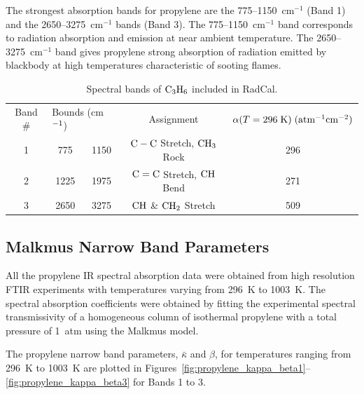 The strongest absorption bands for propylene are the 775--1150~cm$^{-1}$ (Band 1) and the 2650--3275~cm$^{-1}$ bands (Band 3). The 775--1150~cm$^{-1}$ band corresponds to radiation absorption and emission at near ambient temperature. The 2650--3275~cm$^{-1}$ band gives propylene strong absorption of radiation emitted by blackbody at high temperatures characteristic of sooting flames.

\begin{table}[ht]
   \centering
   \caption{Spectral bands of $\rm C_3H_6$ included in RadCal.}
   \vspace{0.1in}
   \label{Table::C3H6}
   \begin{tabular}{|c|c|c|c|c|}
    \hline
    Band \# & \multicolumn{2}{|l|}{Bounds (cm$\rm ^{-1}$) } & Assignment & $\alpha(T=296 \; {\rm K}) \; (\rm {atm^{-1} cm^{-2}})$\\
    \cline{1-5}
    1 & 775  & 1150 &  $\rm C-C$ Stretch, $\rm CH_3$ Rock & 296 \\
    2 & 1225 & 1975 &  $\rm C=C$ Stretch, $\rm CH$ Bend   & 271 \\
    3 & 2650 & 3275 &  $\rm CH$ \& $\rm CH_2$ Stretch      & 509 \\
    \hline
   \end{tabular}
\end{table}

\subsection{Malkmus Narrow Band Parameters}

All the propylene IR spectral absorption data were obtained from high resolution FTIR experiments with temperatures varying from 296~K to 1003~K. The spectral absorption coefficients were obtained by fitting the experimental spectral transmissivity of a homogeneous column of isothermal propylene with a total pressure of 1~atm using the Malkmus model.

The propylene narrow band parameters, $\bar{\kappa}$ and $\beta$, for temperatures ranging from 296~K to 1003~K are plotted in Figures~\ref{fig:propylene_kappa_beta1}--\ref{fig:propylene_kappa_beta3} for Bands 1 to 3.

\newpage

